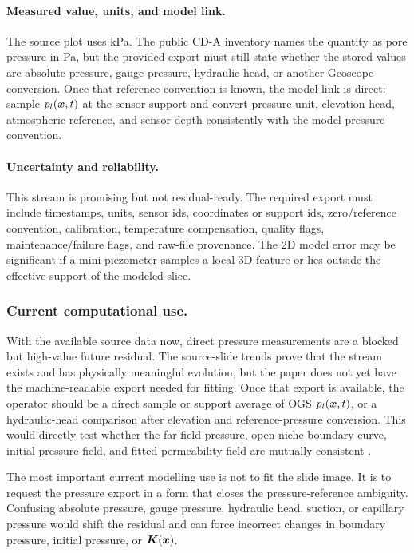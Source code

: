 \paragraph{Measured value, units, and model link.}
The source plot uses kPa.  The public CD-A inventory names the quantity as pore
pressure in Pa, but the provided export must still state whether the stored values
are absolute pressure, gauge pressure, hydraulic head, or another Geoscope
conversion.  Once that reference convention is known, the model link is direct:
sample \(p_l(\bm{x},t)\) at the sensor support and convert pressure unit, elevation
head, atmospheric reference, and sensor depth consistently with the model pressure
convention.

\paragraph{Uncertainty and reliability.}
This stream is promising but not residual-ready.  The required export must include
timestamps, units, sensor ids, coordinates or support ids, zero/reference
convention, calibration, temperature compensation, quality flags,
maintenance/failure flags, and raw-file provenance.  The 2D model error may be
significant if a mini-piezometer samples a local 3D feature or lies outside the
effective support of the modeled slice.

\subsubsection*{Current computational use.}
With the available source data now, direct pressure measurements are a blocked but
high-value future residual.  The source-slide trends prove that the stream exists
and has physically meaningful evolution, but the paper does not yet have the
machine-readable export needed for fitting.  Once that export is available, the
operator should be a direct sample or support average of OGS \(p_l(\bm{x},t)\), or a
hydraulic-head comparison after elevation and reference-pressure conversion.  This
would directly test whether the far-field pressure, open-niche boundary curve,
initial pressure field, and fitted permeability field are mutually consistent
\citep[Table~1]{Ziefle2024Characterization}
\citep[Secs.~2.4 and 3.2]{Graebling2022VEIS}
\citep[PDF p.~32]{CDATDSlides2026Email}
\citep[provided pressure/HM source files and generated trend figures]{CDAProvidedMeasurementFiles2025}.

The most important current modelling use is not to fit the slide image.  It is to
request the pressure export in a form that closes the pressure-reference ambiguity.
Confusing absolute pressure, gauge pressure, hydraulic head, suction, or capillary
pressure would shift the residual and can force incorrect changes in boundary
pressure, initial pressure, or \(\bm{K}(\bm{x})\).

